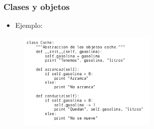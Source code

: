 \begin{frame}[fragile]
  \frametitle{Clases y objetos}

  \begin{itemize}
  \item{Ejemplo:}
  \end{itemize}
  
  
  \begin{figure}
    \includegraphics[width=0.6\textwidth]{Imagenes/Ejm2.jpg}
  \end{figure}
  
\end{frame}
